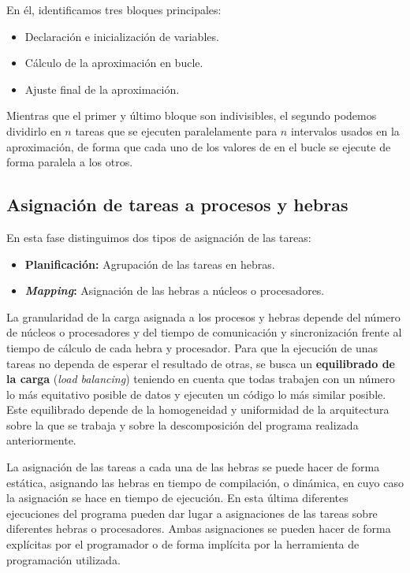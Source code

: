 En él, identificamos tres bloques principales:

\begin{itemize}
	\item Declaración e inicialización de variables.
	\item Cálculo de la aproximación en bucle.
	\item Ajuste final de la aproximación.
\end{itemize}

Mientras que el primer y último bloque son indivisibles, el segundo podemos dividirlo en $n$ tareas que se ejecuten paralelamente para $n$ intervalos usados en la aproximación, de forma que cada uno de los valores de  en el bucle se ejecute de forma paralela a los otros.

\subsection{Asignación de tareas a procesos y hebras}\label{asignacion-tareas-procheb}

En esta fase distinguimos dos tipos de asignación de las tareas:

\begin{itemize}
	\item\textbf{Planificación:} Agrupación de las tareas en hebras.
	\item\textbf{\textit{Mapping}:} Asignación de las hebras a núcleos o procesadores.
\end{itemize}

La granularidad de la carga asignada a los procesos y hebras depende del número de núcleos o procesadores y del tiempo de comunicación y sincronización frente al tiempo de cálculo de cada hebra y procesador.
Para que la ejecución de unas tareas no dependa de esperar el resultado de otras, se busca un \textbf{equilibrado de la carga} (\textit{load balancing}) teniendo en cuenta que todas trabajen con un número lo más equitativo posible de datos y ejecuten un código lo más similar posible.
Este equilibrado depende de la homogeneidad y uniformidad de la arquitectura sobre la que se trabaja y sobre la descomposición del programa realizada anteriormente.

La asignación de las tareas a cada una de las hebras se puede hacer de forma estática, asignando las hebras en tiempo de compilación, o dinámica, en cuyo caso la asignación se hace en tiempo de ejecución.
En esta última diferentes ejecuciones del programa pueden dar lugar a asignaciones de las tareas sobre diferentes hebras o procesadores.
Ambas asignaciones se pueden hacer de forma explícitas por el programador o de forma implícita por la herramienta de programación utilizada.

